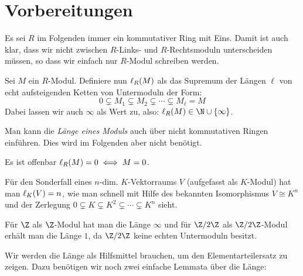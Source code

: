 
\chapter{Vorbereitungen}
Es sei $R$ im Folgenden immer ein kommutativer Ring mit Eins. Damit ist auch klar, dass
wir nicht zwischen $R$-Links- und $R$-Rechtsmoduln unterscheiden müssen, so dass
wir einfach nur $R$-Modul schreiben werden.

\begin{thDef}
    Sei $M$ ein $R$-Modul. Definiere nun $\len(M)$ als das Supremum der Längen
    $\ell$ von echt aufsteigenden Ketten von Untermoduln der Form:
    \[ 0 \subsetneq M_1 \subsetneq M_2 \subsetneq \cdots \subsetneq M_\ell = M \]
    Dabei lassen wir auch $\infty$ als Wert zu, also: $\len(M) \in
    \N\cup\{\infty\}$.
\end{thDef}

\begin{thBemerkung}
    Man kann die \emph{Länge eines Moduls} auch über nicht kommutativen Ringen
    einführen. Dies wird im Folgenden aber nicht benötigt.
\end{thBemerkung}

\begin{BspList}
\item
    Es ist offenbar $\len(M) = 0 \iff M = 0$.
\item
    Für den Sonderfall eines $n$-dim. $K$-Vektorraums $V$ (aufgefasst als
    $K$-Modul) hat man $\len[K](V) = n$, wie man schnell mit Hilfe des bekannten
    Isomorphismus $V \cong K^n$ und der Zerlegung $0\subsetneq K \subsetneq
    K^2 \subsetneq \cdots \subsetneq K^n$ sieht.
\item
    Für $\Z$ als $\Z$-Modul hat man die Länge $\infty$ und für $\ZRest2$ als
    $\ZRest2$-Modul erhält man die Länge $1$, da $\ZRest2$ keine echten
    Untermoduln besitzt.
\end{BspList}

Wir werden die Länge als Hilfsmittel brauchen, um den Elementarteilersatz
 zu zeigen. Dazu benötigen wir noch zwei einfache Lemmata über die
Länge:


